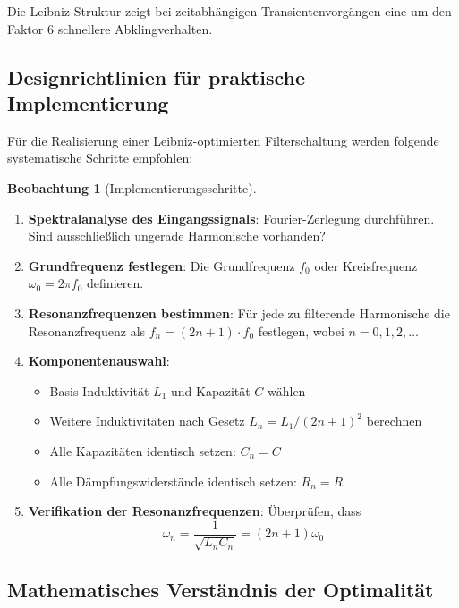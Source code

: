 \documentclass[a4paper,12pt,twoside]{report}
\theoremstyle{definition}
\newtheorem{beobachtung}{Beobachtung}
\begin{document}
Die Leibniz-Struktur zeigt bei zeitabhängigen Transientenvorgängen eine um den Faktor 6 schnellere Abklingverhalten.

\subsection{Designrichtlinien für praktische Implementierung}

Für die Realisierung einer Leibniz-optimierten Filterschaltung werden folgende systematische Schritte empfohlen:

\begin{beobachtung}[Implementierungsschritte]
\begin{enumerate}
	\item \textbf{Spektralanalyse des Eingangssignals}: Fourier-Zerlegung durchführen. Sind ausschließlich ungerade Harmonische vorhanden?
	
	\item \textbf{Grundfrequenz festlegen}: Die Grundfrequenz $f_0$ oder Kreisfrequenz $\omega_0 = 2\pi f_0$ definieren.
	
	\item \textbf{Resonanzfrequenzen bestimmen}: Für jede zu filterende Harmonische die Resonanzfrequenz als $f_n = (2n+1) \cdot f_0$ festlegen, wobei $n = 0, 1, 2, \ldots$
	
	\item \textbf{Komponentenauswahl}:
	\begin{itemize}
		\item Basis-Induktivität $L_1$ und Kapazität $C$ wählen
		\item Weitere Induktivitäten nach Gesetz $L_n = L_1 / (2n+1)^2$ berechnen
		\item Alle Kapazitäten identisch setzen: $C_n = C$
		\item Alle Dämpfungswiderstände identisch setzen: $R_n = R$
	\end{itemize}
	
	\item \textbf{Verifikation der Resonanzfrequenzen}: Überprüfen, dass 
	$$\omega_n = \frac{1}{\sqrt{L_n C_n}} = (2n+1) \omega_0$$
\end{enumerate}
\end{beobachtung}

\subsection{Mathematisches Verständnis der Optimalität}
\end{document}
